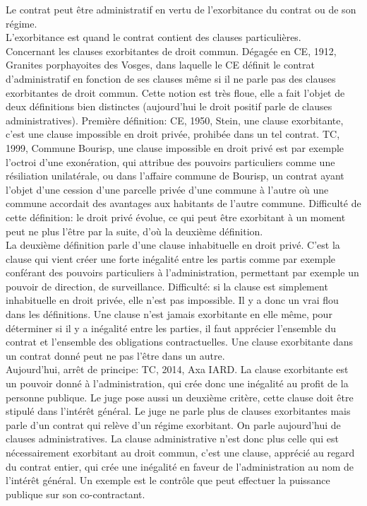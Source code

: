 \documentclass[10pt, a4paper, openany]{book}
\begin{document}
Le contrat peut être administratif en vertu de l'exorbitance du contrat ou de son régime. \\
L'exorbitance est quand le contrat contient des clauses particulières. \\
Concernant les clauses exorbitantes de droit commun. Dégagée en CE, 1912, Granites porphayoites des Vosges, dans laquelle le CE définit le contrat d'administratif en fonction de ses clauses même si il ne parle pas des clauses exorbitantes de droit commun. Cette notion est très floue, elle a fait l'objet de deux définitions bien distinctes (aujourd'hui le droit positif parle de clauses administratives). Première définition: CE, 1950, Stein, une clause exorbitante, c'est une clause impossible en droit privée, prohibée dans un tel contrat. TC, 1999, Commune Bourisp, une clause impossible en droit privé est par exemple l'octroi d'une exonération, qui attribue des pouvoirs particuliers comme une résiliation unilatérale, ou dans l'affaire commune de Bourisp, un contrat ayant l'objet d'une cession d'une parcelle privée d'une commune à l'autre où une commune accordait des avantages aux habitants de l'autre commune. Difficulté de cette définition: le droit privé évolue, ce qui peut être exorbitant à un moment peut ne plus l'être par la suite, d'où la deuxième définition. \\
La deuxième définition parle d'une clause inhabituelle en droit privé. C'est la clause qui vient créer une forte inégalité entre les partis comme par exemple conférant des pouvoirs particuliers à l'administration, permettant par exemple un pouvoir de direction, de surveillance. Difficulté: si la clause est simplement inhabituelle en droit privée, elle n'est pas impossible. Il y a donc un vrai flou dans les définitions. Une clause n'est jamais exorbitante en elle même, pour déterminer si il y a inégalité entre les parties, il faut apprécier l'ensemble du contrat et l'ensemble des obligations contractuelles. Une clause exorbitante dans un contrat donné peut ne pas l'être dans un autre. \\
Aujourd'hui, arrêt de principe: TC, 2014, Axa IARD. La clause exorbitante est un pouvoir donné à l'administration, qui crée donc une inégalité au profit de la personne publique. Le juge pose aussi un deuxième critère, cette clause doit être stipulé dans l'intérêt général. Le juge ne parle plus de clauses exorbitantes mais parle d'un contrat qui relève d'un régime exorbitant. On parle aujourd'hui de clauses administratives. La clause administrative n'est donc plus celle qui est nécessairement exorbitant au droit commun, c'est une clause, apprécié au regard du contrat entier, qui crée une inégalité en faveur de l'administration au nom de l'intérêt général. Un exemple est le contrôle que peut effectuer la puissance publique sur son co-contractant. \\
\end{document}
